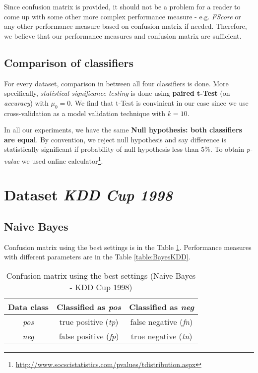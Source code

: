 \documentclass[11pt,a4paper,titlepage]{article}
\begin{document}
Since confusion matrix is provided, it should not be a problem for a reader to come up with some other more complex performance measure - e.g. \textit{FScore} or any other performance measure based on confusion matrix if needed. Therefore, we believe that our performance measures and confusion matrix are sufficient.

\subsection{Comparison of classifiers}

For every dataset, comparison in between all four classifiers is done. More specifically, \textit{statistical significance testing} is done using \textbf{paired t-Test} (on \textit{accuracy}) with $\mu_0 = 0$. We find that t-Test is convinient in our case since we use cross-validation as a model validation technique with $k=10$. 

In all our experiments, we have the same \textbf{Null hypothesis: both classifiers are equal}. By convention, we reject null hypothesis and say difference is statistically significant if probability of null hypothesis less than 5\%. To obtain \textit{p-value} we used online calculator\footnote{\url{http://www.socscistatistics.com/pvalues/tdistribution.aspx}}.


\section{Dataset \textit{KDD Cup 1998}}

\subsection{Naive Bayes}
Confusion matrix using the best settings is in the Table \ref{table:confusionMatrixBayesKDD}. Performance measures with different parameters are in the Table \ref{table:BayesKDD}.
\begin{table}
  \centering
  \begin{tabular}{| c | c | c |}
    \hline
    Data class & Classified as \textit{pos} & Classified as \textit{neg} \\ \hline
    \textit{pos} & true positive (\textit{tp}) & false negative (\textit{fn}) \\ \hline
    \textit{neg} & false positive (\textit{fp}) & true negative (\textit{tn}) \\
    \hline
  \end{tabular}
  \caption{Confusion matrix using the best settings (Naive Bayes - KDD Cup 1998)}
  \label{table:confusionMatrixBayesKDD}
  \end{table}
  
\end{document}
